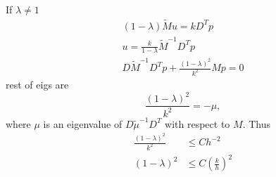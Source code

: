 \documentclass[11pt]{article}
\begin{document}
If $\lambda \neq 1$
\begin{equation}
\begin{split}
(1-\lambda)\tilde{M}u=kD^Tp \\
u = \frac{k}{1-\lambda}\tilde{M}^{-1}D^Tp \\
D\tilde{M}^{-1}D^Tp + \frac{(1-\lambda)^2}{k^2}Mp=0
\end{split}
\end{equation}
rest of eigs are 
\begin{equation}
\frac{(1-\lambda)^2}{k^2} = -\mu,
\end{equation}
where $\mu$ is an eigenvalue of $D\tilde{\mu}^{-1}D^T$ with respect to $M$. Thus
\begin{equation}
\begin{split}
\frac{(1-\lambda)^2}{k^2} &\leq Ch^{-2} \\
(1-\lambda)^2 &\leq C\left(\frac{k}{h}\right)^2
\end{split}
\end{equation}


 
\end{document}
